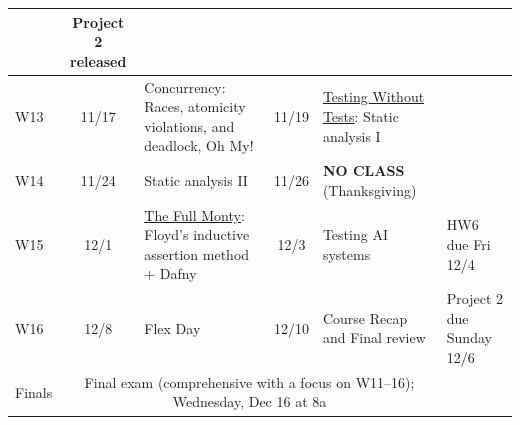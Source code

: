 \documentclass[letterpaper,11pt]{article}
\begin{document}
{\begin{tabular}{l|cp{}|cp{}|p{}}
  & Project 2 released \\ \hline
  W13
  & 11/17 & Concurrency: Races, atomicity violations, and deadlock, Oh My!
  & 11/19 & \underline{Testing Without Tests}: Static analysis I
  & \\ \hline
  W14
  & 11/24 & Static analysis II
  & 11/26 & \textbf{NO CLASS} (Thanksgiving)
  & \\ \hline
  W15
  & 12/1 & \underline{The Full Monty}: Floyd's inductive assertion
           method + Dafny
  & 12/3 & Testing AI systems
  & HW6 due Fri 12/4 \\ \hline
  W16
  & 12/8 & Flex Day
  & 12/10 & Course Recap and Final review
  & Project 2 due Sunday 12/6 \\ \hline
  Finals
  & \multicolumn{4}{p{.5\textwidth}|}{Final exam (comprehensive with a
    focus on W11--16); Wednesday, Dec 16 at 8a}
    & \\ \hline
\end{tabular}
}
\end{document}
